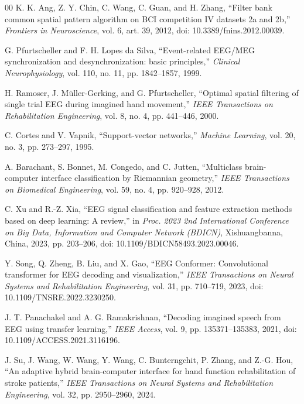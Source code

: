 \begin{thebibliography}{00}
K. K. Ang, Z. Y. Chin, C. Wang, C. Guan, and H. Zhang, ``Filter bank common spatial
pattern algorithm on BCI competition IV datasets 2a and 2b,'' \textit{Frontiers in
Neuroscience}, vol. 6, art. 39, 2012, doi: 10.3389/fnins.2012.00039.

G. Pfurtscheller and F. H. Lopes da Silva, ``Event-related EEG/MEG synchronization
and desynchronization: basic principles,'' \textit{Clinical Neurophysiology},
vol. 110, no. 11, pp. 1842--1857, 1999.

H. Ramoser, J. M\"{u}ller-Gerking, and G. Pfurtscheller, ``Optimal spatial filtering
of single trial EEG during imagined hand movement,'' \textit{IEEE Transactions on
Rehabilitation Engineering}, vol. 8, no. 4, pp. 441--446, 2000.

C. Cortes and V. Vapnik, ``Support-vector networks,'' \textit{Machine Learning},
vol. 20, no. 3, pp. 273--297, 1995.

A. Barachant, S. Bonnet, M. Congedo, and C. Jutten, ``Multiclass brain-computer
interface classification by Riemannian geometry,'' \textit{IEEE Transactions on Biomedical
Engineering}, vol. 59, no. 4, pp. 920--928, 2012.

C. Xu and R.-Z. Xia, ``EEG signal classification and feature extraction methods based
on deep learning: A review,'' in \textit{Proc. 2023 2nd International Conference on
Big Data, Information and Computer Network (BDICN)}, Xishuangbanna, China, 2023,
pp. 203--206, doi: 10.1109/BDICN58493.2023.00046.

Y. Song, Q. Zheng, B. Liu, and X. Gao, ``EEG Conformer: Convolutional transformer for
EEG decoding and visualization,'' \textit{IEEE Transactions on Neural Systems and
Rehabilitation Engineering}, vol. 31, pp. 710--719, 2023,
doi: 10.1109/TNSRE.2022.3230250.

J. T. Panachakel and A. G. Ramakrishnan, ``Decoding imagined speech from EEG using
transfer learning,'' \textit{IEEE Access}, vol. 9, pp. 135371--135383, 2021,
doi: 10.1109/ACCESS.2021.3116196.

J. Su, J. Wang, W. Wang, Y. Wang, C. Bunterngchit, P. Zhang, and Z.-G. Hou,
``An adaptive hybrid brain-computer interface for hand function rehabilitation
of stroke patients,'' \textit{IEEE Transactions on Neural Systems and
Rehabilitation Engineering}, vol. 32, pp. 2950--2960, 2024.


\end{thebibliography}
